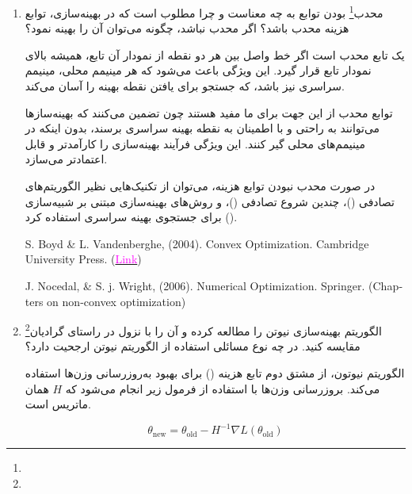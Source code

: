 \begin{enumerate}
	
	
	\item
محدب\footnote{} بودن توابع به چه معناست و چرا مطلوب است که در بهینه‌سازی، توابع هزینه محدب باشد؟ اگر محدب نباشد، چگونه می‌توان آن را بهینه نمود؟

\begin{qsolve}
یک تابع محدب است اگر خط واصل بین هر دو نقطه از نمودار آن تابع، همیشه بالای نمودار تابع قرار گیرد. این ویژگی باعث می‌شود که هر مینیمم محلی، مینیمم سراسری نیز باشد، که جستجو برای یافتن نقطه بهینه را آسان می‌کند.

توابع محدب از این جهت برای ما مفید هستند چون تضمین می‌کنند که بهینه‌سازها می‌توانند به راحتی و با اطمینان به نقطه بهینه سراسری برسند، بدون اینکه در مینیمم‌های محلی گیر کنند. این ویژگی فرآیند بهینه‌سازی را کارآمدتر و قابل اعتمادتر می‌سازد.

در صورت محدب نبودن توابع هزینه، می‌توان از تکنیک‌هایی نظیر الگوریتم‌های تصادفی ()، چندین شروع تصادفی ()، و روش‌های بهینه‌سازی مبتنی بر شبیه‌سازی () برای جستجوی بهینه سراسری استفاده کرد.

\begin{latin}
	\begin{thebibliography}{9}
		S. Boyd \& L. Vandenberghe, (2004). Convex Optimization. Cambridge University Press.
		(\href{https://web.stanford.edu/~boyd/cvxbook/}{\textcolor{magenta}{Link}})
		
		J. Nocedal, \& S. j. Wright, (2006). Numerical Optimization. Springer. (Chapters on non-convex optimization)
	\end{thebibliography} 
\end{latin}
	
\end{qsolve}
	
	
	
	
	
	\item 
الگوریتم بهینه‌سازی نیوتن را مطالعه کرده و آن را با نزول در راستای گرادیان\footnote{} مقایسه کنید. در چه نوع مسائلی استفاده از الگوریتم نیوتن ارجحیت دارد؟
	
\begin{qsolve}
الگوریتم نیوتون، از مشتق دوم تابع هزینه () برای بهبود به‌روزرسانی وزن‌ها استفاده می‌کند. بروزرسانی وزن‌ها با استفاده از فرمول زیر انجام می‌شود که $H$ همان ماتریس  است.

$$ \theta_{\text{new}} = \theta_{\text{old}} - H^{-1} \nabla L(\theta_{\text{old}})  $$


\end{qsolve}
\end{enumerate}
